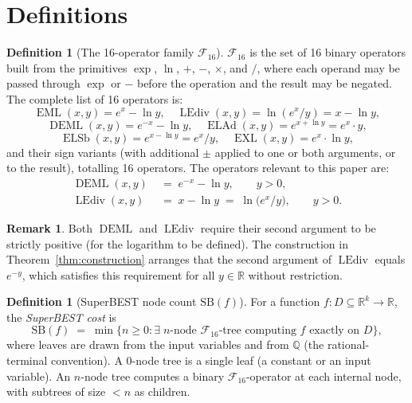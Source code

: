 \documentclass[12pt,a4paper]{article}
\theoremstyle{definition}
\newtheorem{definition}[theorem]{Definition}
\newtheorem{remark}[theorem]{Remark}
\newcommand{\EML}{\operatorname{EML}}
\newcommand{\EXL}{\operatorname{EXL}}
\newcommand{\DEML}{\operatorname{DEML}}
\newcommand{\ELAd}{\operatorname{ELAd}}
\newcommand{\ELSb}{\operatorname{ELSb}}
\newcommand{\LEdiv}{\operatorname{LEdiv}}
\newcommand{\SB}{\mathrm{SB}}
\newcommand{\F}{\mathcal{F}_{16}}
\newcommand{\R}{\mathbb{R}}
\newcommand{\Q}{\mathbb{Q}}
\begin{document}
\section{Definitions}
\label{sec:def}

\begin{definition}[The 16-operator family $\F$]
\label{def:F16}
$\F$ is the set of 16 binary operators built from the primitives $\exp$, $\ln$,
$+$, $-$, $\times$, and $/$, where each operand may be passed through $\exp$ or
$-$ before the operation and the result may be negated.
The complete list of 16 operators is:
\[
  \EML(x,y) = e^x - \ln y, \quad \LEdiv(x,y) = \ln(e^x / y) = x - \ln y,
\]
\[
  \DEML(x,y) = e^{-x} - \ln y, \quad \ELAd(x,y) = e^{x+\ln y} = e^x \cdot y,
\]
\[
  \ELSb(x,y) = e^{x - \ln y} = e^x / y, \quad \EXL(x,y) = e^x \cdot \ln y,
\]
and their sign variants (with additional $\pm$ applied to one or both arguments,
or to the result), totalling 16 operators.
The operators relevant to this paper are:
\begin{align}
  \DEML(x, y) &\;=\; e^{-x} - \ln y, \qquad y > 0, \label{eq:deml} \\
  \LEdiv(x, y) &\;=\; x - \ln y
                 \;=\; \ln\!\bigl(e^x / y\bigr), \qquad y > 0. \label{eq:lediv}
\end{align}
\end{definition}

\begin{remark}
Both $\DEML$ and $\LEdiv$ require their second argument to be strictly positive
(for the logarithm to be defined).
The construction in Theorem~\ref{thm:construction} arranges that the second
argument of $\LEdiv$ equals $e^{-y}$, which satisfies this requirement for all
$y \in \R$ without restriction.
\end{remark}

\begin{definition}[SuperBEST node count $\SB(f)$]
\label{def:SB}
For a function $f \colon D \subseteq \R^k \to \R$, the \emph{SuperBEST cost}
is
\[
  \SB(f) \;=\; \min\bigl\{n \ge 0 : \exists\;\text{$n$-node $\F$-tree computing
  $f$ exactly on $D$}\bigr\},
\]
where leaves are drawn from the input variables and from $\Q$
(the rational-terminal convention).
A 0-node tree is a single leaf (a constant or an input variable).
An $n$-node tree computes a binary $\F$-operator at each internal node, with
subtrees of size $< n$ as children.
\end{definition}
\end{document}
